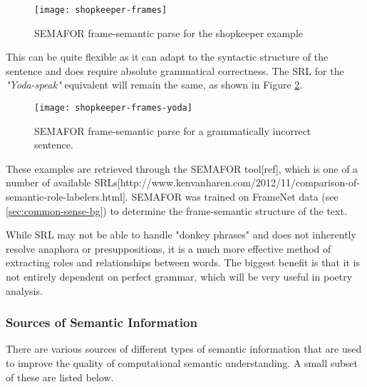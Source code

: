 \begin{figure}[h!]
\centering
\texttt{[image: shopkeeper-frames]}
\caption{SEMAFOR frame-semantic parse for the shopkeeper example}
\label{fig:shopkeeper-frames}
\end{figure}

This can be quite flexible as it can adapt to the syntactic structure of the sentence and does require absolute grammatical correctness. The SRL for the \textit{"Yoda-speak"} equivalent will remain the same, as shown in Figure \ref{fig:shopkeeper-frames-yoda}.

\begin{figure}[h!]
\centering
\texttt{[image: shopkeeper-frames-yoda]}
\caption{SEMAFOR frame-semantic parse for a grammatically incorrect sentence.}
\label{fig:shopkeeper-frames-yoda}
\end{figure}

These examples are retrieved through the SEMAFOR tool[ref],  which is one of a number of available SRLs[http://www.kenvanharen.com/2012/11/comparison-of-semantic-role-labelers.html]. SEMAFOR was trained on FrameNet data (see \ref{sec:common-sense-bg}) to determine the frame-semantic structure of the text.

While SRL may not be able to handle "donkey phrases" and does not inherently resolve anaphora or presuppositions, it is a much more effective method of extracting roles and relationships between words. The biggest benefit is that it is not entirely dependent on perfect grammar, which will be very useful in poetry analysis.


\subsubsection{Sources of Semantic Information}
There are various sources of different types of semantic information that are used to improve the quality of computational semantic understanding. A small subset of these are listed below.

